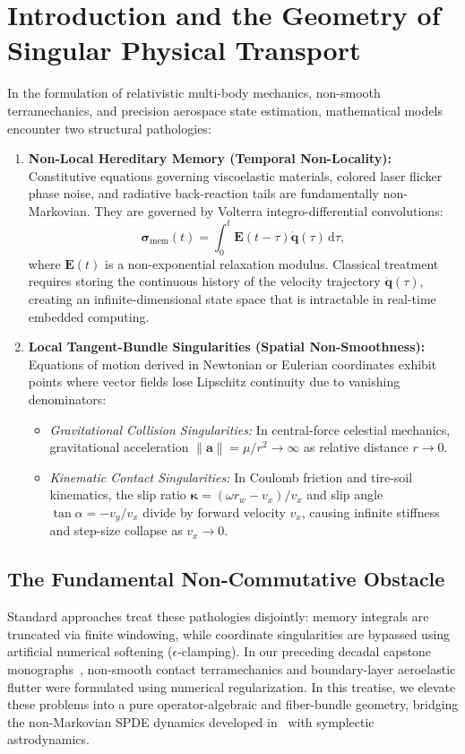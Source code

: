 \documentclass[11pt,a4paper,reqno]{article}
\theoremstyle{plain}
\theoremstyle{definition}
\theoremstyle{remark}
\numberwithin{equation}{section}
\begin{document}
\section{Introduction and the Geometry of Singular Physical Transport}
\label{sec:introduction}

In the formulation of relativistic multi-body mechanics, non-smooth terramechanics, and precision aerospace state estimation, mathematical models encounter two structural pathologies:
\begin{enumerate}[label=\textbf{(\alph*)}, leftmargin=2.0em]
  \item \textbf{Non-Local Hereditary Memory (Temporal Non-Locality):} Constitutive equations governing viscoelastic materials, colored laser flicker phase noise, and radiative back-reaction tails are fundamentally non-Markovian. They are governed by Volterra integro-differential convolutions:
  \begin{equation}\label{eq:intro_volterra}
    \bm{\sigma}_{\mathrm{mem}}(t) = \int_0^t \mathbf{E}(t - \tau) \dot{\mathbf{q}}(\tau)\,\mathrm{d}\tau,
  \end{equation}
  where $\mathbf{E}(t)$ is a non-exponential relaxation modulus. Classical treatment requires storing the continuous history of the velocity trajectory $\dot{\mathbf{q}}(\tau)$, creating an infinite-dimensional state space that is intractable in real-time embedded computing.
  \item \textbf{Local Tangent-Bundle Singularities (Spatial Non-Smoothness):} Equations of motion derived in Newtonian or Eulerian coordinates exhibit points where vector fields lose Lipschitz continuity due to vanishing denominators:
  \begin{itemize}[leftmargin=1.5em]
    \item \emph{Gravitational Collision Singularities:} In central-force celestial mechanics, gravitational acceleration $\|\mathbf{a}\| = \mu / r^2 \to \infty$ as relative distance $r \to 0$.
    \item \emph{Kinematic Contact Singularities:} In Coulomb friction and tire-soil kinematics, the slip ratio $\bm{\kappa} = (\omega r_w - v_x) / v_x$ and slip angle $\tan\alpha = -v_y / v_x$ divide by forward velocity $v_x$, causing infinite stiffness and step-size collapse as $v_x \to 0$.
  \end{itemize}
\end{enumerate}

\subsection{The Fundamental Non-Commutative Obstacle}
Standard approaches treat these pathologies disjointly: memory integrals are truncated via finite windowing, while coordinate singularities are bypassed using artificial numerical softening ($\epsilon$-clamping). In our preceding decadal capstone monographs~\cite{PillarXPreprint, PillarIXPreprint}, non-smooth contact terramechanics and boundary-layer aeroelastic flutter were formulated using numerical regularization. In this treatise, we elevate these problems into a pure operator-algebraic and fiber-bundle geometry, bridging the non-Markovian SPDE dynamics developed in~\cite{SPDEV60} with symplectic astrodynamics.
\end{document}
